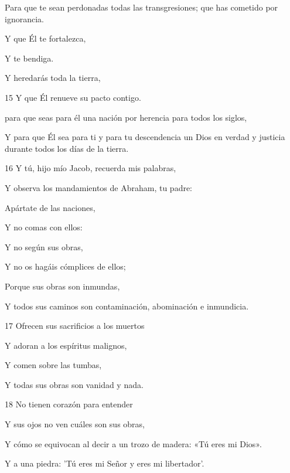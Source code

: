 \par     Para que te sean perdonadas todas las transgresiones; que has cometido por ignorancia.
\par    
\par     Y que Él te fortalezca,  
\par     Y te bendiga.  
\par     Y heredarás toda la tierra,
\par    
\par 15 Y que Él renueve su pacto contigo.  
\par     para que seas para él una nación por herencia para todos los siglos,  
\par     Y para que Él sea para ti y para tu descendencia un Dios en verdad y justicia durante todos los días de la tierra.
\par    
\par 16 Y tú, hijo mío Jacob, recuerda mis palabras,  
\par     Y observa los mandamientos de Abraham, tu padre:
\par    
\par     Apártate de las naciones,  
\par     Y no comas con ellos:
\par    
\par     Y no según sus obras,  
\par     Y no os hagáis cómplices de ellos;
\par    
\par     Porque sus obras son inmundas,  
\par     Y todos sus caminos son contaminación, abominación e inmundicia.
\par    
\par 17 Ofrecen sus sacrificios a los muertos  
\par     Y adoran a los espíritus malignos,
\par    
\par     Y comen sobre las tumbas,  
\par     Y todas sus obras son vanidad y nada.
\par    
\par 18 No tienen corazón para entender  
\par     Y sus ojos no ven cuáles son sus obras,
\par    
\par     Y cómo se equivocan al decir a un trozo de madera: «Tú eres mi Dios».  
\par     Y a una piedra: 'Tú eres mi Señor y eres mi libertador'.  
